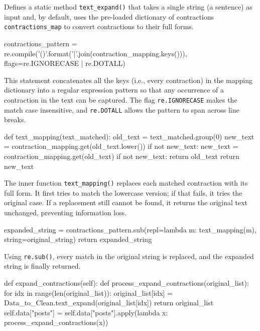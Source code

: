 \documentclass[12pt]{article}
\numberwithin{figure}{section}  %
\begin{document}
\begin{enumerate}
Defines a static method \texttt{text\_expand()} that takes a single string (a
sentence) as input and, by default, uses the pre-loaded dictionary of
contractions \texttt{contractions\_map} to convert contractions to their full
forms.

\begin{python}
contractions_pattern = re.compile('({})'.format('|'.join(contraction_mapping.keys())), flags=re.IGNORECASE | re.DOTALL)
\end{python}

This statement concatenates all the keys (i.e., every contraction) in the
mapping dictionary into a regular expression pattern so that any occurrence of
a contraction in the text can be captured. The flag \texttt{re.IGNORECASE}
makes the match case insensitive, and \texttt{re.DOTALL} allows the pattern to
span across line breaks.

\begin{python}
def text_mapping(text_matched):
    old_text = text_matched.group(0)
    new_text = contraction_mapping.get(old_text.lower())
    if not new_text:
        new_text = contraction_mapping.get(old_text)
        if not new_text:
            return old_text
    return new_text
\end{python}

The inner function \texttt{text\_mapping()} replaces each matched contraction
with its full form. It first tries to match the lowercase version; if that
fails, it tries the original case. If a replacement still cannot be found, it
returns the original text unchanged, preventing information loss.

\begin{python}
expanded_string = contractions_pattern.sub(repl=lambda m: text_mapping(m), string=original_string)
return expanded_string
\end{python}

Using \texttt{re.sub()}, every match in the original string is replaced, and
the expanded string is finally returned.

\begin{python}
def expand_contractions(self):
    def process_expand_contractions(original_list):
        for idx in range(len(original_list)):
            original_list[idx] = Data_to_Clean.text_expand(original_list[idx])
        return original_list
    self.data["posts"] = self.data["posts"].apply(lambda x: process_expand_contractions(x))
\end{python}


\end{enumerate}
\end{document}
